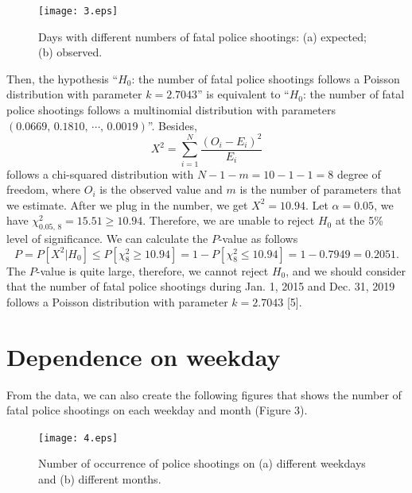 \documentclass[a4paper]{article}
\begin{document}
\begin{figure}[H]
\centering
\texttt{[image: 3.eps]}
\captionsetup{justification=centering}
\caption{Days with different numbers of fatal police shootings: (a) expected; (b) observed.}
\end{figure}

	Then, the hypothesis “$H_0$: the number of fatal police shootings follows a Poisson distribution with parameter $k=2.7043$” is equivalent to “$H_0$: the number of fatal police shootings follows a multinomial distribution with parameters $(0.0669,\, 0.1810,\,\cdots,\,0.0019)$”. Besides, $$X^2=\sum_{i=1}^N\frac{(O_i-E_i)^2}{E_i}$$ follows a chi-squared distribution with $N-1-m=10-1-1=8$ degree of freedom, where $O_i$ is the observed value and $m$ is the number of parameters that we estimate. After we plug in the number, we get $X^2=10.94$. Let $\alpha=0.05$, we have $\chi_{0.05,\,8}^2=15.51\ge10.94$. Therefore, we are unable to reject $H_0$ at the 5\% level of significance. We can calculate the $P$-value as follows $$P=P[X^2|H_0]\le P[\chi_8^2\ge10.94]=1-P[\chi_8^2\le10.94]=1-0.7949=0.2051.$$The $P$-value is quite large, therefore, we cannot reject $H_0$, and we should consider that the number of fatal police shootings during Jan. 1, 2015 and Dec. 31, 2019 follows a Poisson distribution with parameter $k=2.7043$ [5].

\section{Dependence on weekday}
	From the data, we can also create the following figures that shows the number of fatal police shootings on each weekday and month (Figure 3).
\begin{figure}[H]
\centering
\texttt{[image: 4.eps]}
\captionsetup{justification=centering}
\caption{Number of occurrence of police shootings on (a) different weekdays and (b) different months.}
\end{figure}
\end{document}
